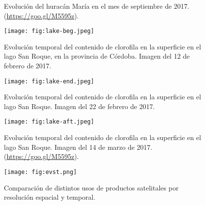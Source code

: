 \begin{frame}{}
    \begin{figure}[h!]
    \centering
    \caption{Evolución del huracán María en el mes de septiembre de 2017. (\href{https://goo.gl/M5595z}{https://goo.gl/M5595z}).}
    \end{figure}
\end{frame}


\begin{frame}{}
    \begin{figure}[h!]
        \centering
        \texttt{[image: fig:lake-beg.jpeg]}
        \caption{Evolución temporal del contenido de clorofila en la superficie en el lago San Roque, en la provincia de Córdoba. Imagen del 12 de febrero de 2017.}
        \label{fig:lake-beg}
    \end{figure}
\end{frame}

\begin{frame}{}
    \begin{figure}[h!]
        \centering
        \texttt{[image: fig:lake-end.jpeg]}
        \caption{Evolución temporal del contenido de clorofila en la superficie en el lago San Roque. Imagen del 22 de febrero de 2017.}
        \label{fig:lake-end}
    \end{figure}
\end{frame}

\begin{frame}{}
    \begin{figure}[h!]
        \centering
        \texttt{[image: fig:lake-aft.jpeg]}
        \caption{Evolución temporal del contenido de clorofila en la superficie en el lago San Roque. Imagen del 14 de marzo de 2017. (\href{https://goo.gl/M5595z}{https://goo.gl/M5595z}).}
        \label{fig:lake-aft}
    \end{figure}
\end{frame}


\begin{frame}{}
    \begin{figure}[h!]
        \centering
        \texttt{[image: fig:evst.png]}
        \caption{Comparación de distintos usos de productos satelitales por resolución espacial y temporal.}
        \label{fig:evst}
    \end{figure}
\end{frame}

\gracias
